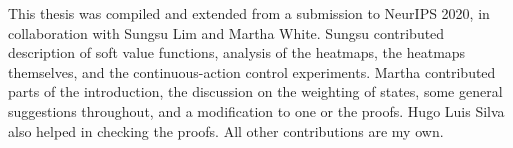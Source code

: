 \documentclass[\main/thesis.tex]{subfiles}
\begin{document}



\begin{preface}
This thesis was compiled and extended from a submission to NeurIPS 2020, in collaboration with Sungsu Lim and Martha White. Sungsu contributed description of soft value functions, analysis of the heatmaps, the heatmaps themselves, and the continuous-action control experiments. Martha contributed parts of the introduction, the discussion on the weighting of states, some general suggestions throughout, and a modification to one or the proofs. Hugo Luis Silva also helped in checking the proofs. All other contributions are my own. 
\end{preface}
\end{document}
